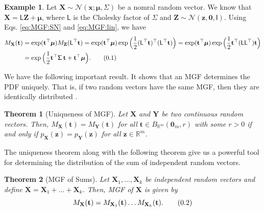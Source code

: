 \documentclass[10pt]{article}
\newtheorem{thm}{Theorem}[section]
\theoremstyle{definition}
\newtheorem{exmp}{Example}[section]
\newcommand\eqnum{\addtocounter{equation}{1}\tag{\arabic{section}.\arabic{equation}}}
\begin{document}
\begin{exmp}
Let $\mathbf{X}\sim\mathcal{N}(\mathbf{x};\boldsymbol{\mu},\mathsf{\Sigma})$ be a nomral random vector. We know that $\mathbf{X} = \mathsf{L}\mathbf{Z}+\boldsymbol{\mu}$, where $\mathsf{L}$ is the Cholesky factor of $\mathsf{\Sigma}$ and $\mathbf{Z}\sim\mathcal{N}(\mathbf{z}, \mathbf{0}, \mathsf{I})$. Using Eqs. \eqref{eq:MGF:SN} and \eqref{eq:MGF:lin}, we have
\begin{align*}
M_{\mathbf{X}}(\mathbf{t}) 
&= \exp(\mathbf{t}^{\top}\boldsymbol{\mu}) M_{\mathbf{Z}}(\mathsf{L}^{\top}\mathbf{t})
= \exp(\mathbf{t}^{\top}\boldsymbol{\mu}) \exp\Big(\frac{1}{2}\mathbf{(\mathsf{L}^{\top}\mathbf{t}})^{\top}(\mathbf{\mathsf{L}^{\top}\mathbf{t}})\Big)
= \exp(\mathbf{t}^{\top}\boldsymbol{\mu}) \exp\Big(\frac{1}{2}\mathbf{t}^{\top}(\mathsf{L}\mathsf{L}^{\top})\mathbf{t}\Big) \\
&= \exp\Big(\frac{1}{2}\mathbf{t}^{\top}\mathsf{\Sigma}\,\mathbf{t}+\mathbf{t}^{\top}\boldsymbol{\mu}\Big).
\eqnum
\label{eq:MGF:N}
\end{align*}
\end{exmp}
We have the following important result. It shows that an MGF determines the PDF uniquely. That is, if two random vectors have the same MGF, then they are identically distributed \cite{Gharamani2019}.
\begin{thm}[Uniqueness of MGF]
Let $\mathbf{X}$ and $\mathbf{Y}$ be two continuous random vectors. Then, $M_{\mathbf{X}}(\mathbf{t})=M_{\mathbf{Y}}(\mathbf{t})$ for all $\mathbf{t}\in B_{\mathbb{R}^m}(\mathbf{0}_m, r)$ with some $r>0$ if and only if  $p_{\mathbf{X}}(\mathbf{z})=p_{\mathbf{Y}}(\mathbf{z})$  for all $\mathbf{z}\in\mathbb{R}^m$.
\end{thm}
The uniqueness theorem along with the following theorem give us a powerful tool for determining the distribution of the sum of independent random vectors.
\begin{thm}[MGF of Sums]\label{thm:MGF:sum}
Let $\mathbf{X}_1,\dots,\mathbf{X}_k$ be independent random vectors and define $\mathbf{X}=\mathbf{X}_1+\dots+\mathbf{X}_k$. Then, MGF of $\mathbf{X}$ is given by
\begin{equation*}
M_{\mathbf{X}}(\mathbf{t}) = M_{\mathbf{X}_1}(\mathbf{t}) \dots M_{\mathbf{X}_k}(\mathbf{t}).
\eqnum
\label{eq:MGF:sum}
\end{equation*}
\end{thm}
\end{document}
